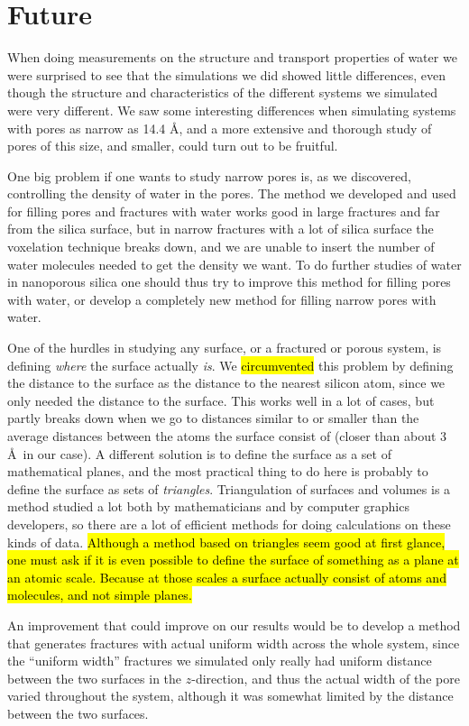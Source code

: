 \chapter{Future}
When doing measurements on the structure and transport properties of water we were surprised to see that the simulations we did showed little differences, even though the structure and characteristics of the different systems we simulated were very different. We saw some interesting differences when simulating systems with pores as narrow as 14.4 \AA, and a more extensive and thorough study of pores of this size, and smaller, could turn out to be fruitful. 

One big problem if one wants to study narrow pores is, as we discovered, controlling the density of water in the pores. The method we developed and used for filling pores and fractures with water works good in large fractures and far from the silica surface, but in narrow fractures with a lot of silica surface the voxelation technique breaks down, and we are unable to insert the number of water molecules needed to get the density we want. To do further studies of water in nanoporous silica one should thus try to improve this method for filling pores with water, or develop a completely new method for filling narrow pores with water.

One of the hurdles in studying any surface, or a fractured or porous system, is defining \emph{where} the surface actually \emph{is}. We \hl{circumvented} this problem by defining the distance to the surface as the distance to the nearest silicon atom, since we only needed the distance to the surface. This works well in a lot of cases, but partly breaks down when we go to distances similar to or smaller than the average distances between the atoms the surface consist of (closer than about 3 \AA\ in our case). A different solution is to define the surface as a set of mathematical planes, and the most practical thing to do here is probably to define the surface as sets of \emph{triangles}. Triangulation of surfaces and volumes is a method studied a lot both by mathematicians and by computer graphics developers, so there are a lot of efficient methods for doing calculations on these kinds of data. \hl{Although a method based on triangles seem good at first glance, one must ask if it is even possible to define the surface of something as a plane at an atomic scale. Because at those scales a surface actually consist of atoms and molecules, and not simple planes.}

An improvement that could improve on our results would be to develop a method that generates fractures with actual uniform width across the whole system, since the ``uniform width'' fractures we simulated only really had uniform distance between the two surfaces in the $z$-direction, and thus the actual width of the pore varied throughout the system, although it was somewhat limited by the distance between the two surfaces.

